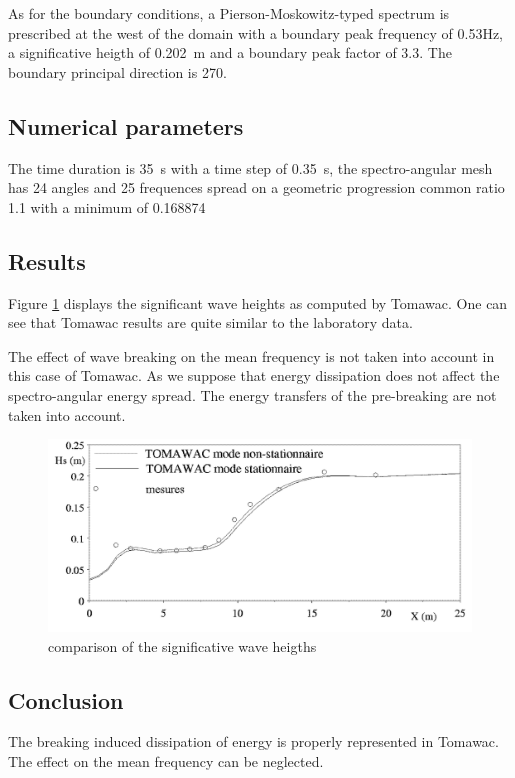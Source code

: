 As for the boundary conditions, a Pierson-Moskowitz-typed spectrum is
prescribed at the west of the domain with a boundary peak frequency of 0.53Hz, a
significative heigth of 0.202~m and a boundary peak factor of 3.3. The boundary
principal direction is 270.
%
%
\subsection{Numerical parameters}
%
The time duration is 35~s with a time step of 0.35~s, the spectro-angular mesh
has 24 angles and 25 frequences spread on a geometric progression common ratio
1.1 with a minimum of 0.168874
%
%
\subsection{Results}
%
Figure \ref{resultbj} displays the significant wave heights as computed by
Tomawac. One can see that Tomawac results are quite similar to the laboratory
data.

The effect of wave breaking on the mean frequency is not taken into account in
this case of Tomawac. As we suppose that energy dissipation does not affect the
spectro-angular energy spread. The energy transfers of the pre-breaking are
not taken into account.
\begin{figure} [!h]
\centering
\includegraphics[scale = 0.8]{results.png}
 \caption{comparison of the significative wave heigths}
\label{resultbj}
\end{figure}
\subsection{Conclusion}
The breaking induced dissipation of energy is properly represented in Tomawac.
The effect on the mean frequency can be neglected.



